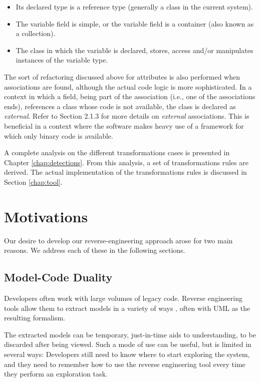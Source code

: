 \begin{itemize}
\item Its declared type is a reference type (generally a class in the current system).
\item The variable field is simple, or the variable field is a container (also known as a collection).
\item The class in which the variable is declared, stores, access and/or manipulates instances of the variable type.

\end{itemize}
The sort of refactoring discussed above for attributes is also performed when associations are found, although the actual code logic is more sophisticated. In a context in which a field, being part of the association (i.e., one of the associations ends), references a class whose code is not available, the class is declared as \textit{external}. Refer to Section 2.1.3 for more details on \textit{external} associations. This is beneficial in a context where the software makes heavy use of a framework for which only binary code is available. 

A complete analysis on the different transformations cases is presented in Chapter \ref{chap:detections}. From this analysis, a set of transformations rules are derived. The actual implementation of the transformations rules is discussed in Section \ref{chap:tool}.

\section{Motivations}

Our desire to develop our reverse-engineering approach arose for two main reasons. We address each of these in the following sections.

\subsection{Model-Code Duality}

Developers often work with large volumes of legacy code. Reverse engineering tools allow them to extract models in a variety of ways \cite{OsmanChaudron}, often with UML as the resulting formalism.

The extracted models can be temporary, just-in-time aids to understanding, to be discarded after being viewed. Such a mode of use can be useful, but is limited in several ways: Developers still need to know where to start exploring the system, and they need to remember how to use the reverse engineering tool every time they perform an exploration task. 

